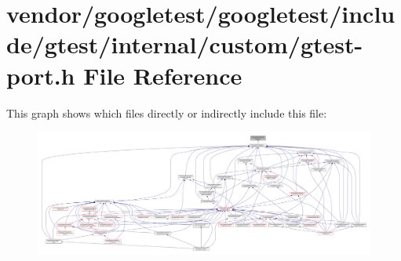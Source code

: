\hypertarget{custom_2gtest-port_8h}{}\section{vendor/googletest/googletest/include/gtest/internal/custom/gtest-\/port.h File Reference}
\label{custom_2gtest-port_8h}
This graph shows which files directly or indirectly include this file\+:
\nopagebreak
\begin{figure}[H]
\begin{center}
\leavevmode
\includegraphics[width=350pt]{custom_2gtest-port_8h__dep__incl}
\end{center}
\end{figure}

